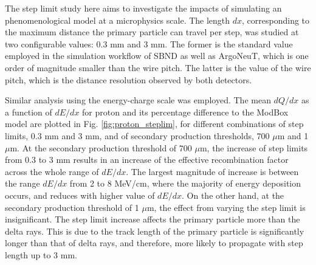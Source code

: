 The step limit study here aims to investigate the impacts of simulating an phenomenological model at a microphysics scale.
The length $dx$, corresponding to the maximum distance the primary particle can travel per step, was studied at two configurable values: 0.3 mm and 3 mm. 
The former is the standard value employed in the simulation workflow of SBND as well as ArgoNeuT, which is one order of magnitude smaller than the wire pitch. 
The latter is the value of the wire pitch, which is the distance resolution observed by both detectors.

Similar analysis using the energy-charge scale was employed.
The mean $dQ/dx$ as a function of $dE/dx$ for proton and its percentage difference to the ModBox model are plotted in Fig. \ref{fig:proton_steplim}, for different combinations of step limits, 0.3 mm and 3 mm, and of secondary production thresholds, 700 $\mu$m and 1 $\mu$m.
At the secondary production threshold of 700 $\mu$m, the increase of step limits from 0.3 to 3 mm results in an increase of the effective recombination factor across the whole range of $dE/dx$.
The largest magnitude of increase is between the range $dE/dx$ from 2 to 8 MeV/cm, where the majority of energy deposition occurs, and reduces with higher value of $dE/dx$.
On the other hand, at the secondary production threshold of 1 $\mu$m, the effect from varying the step limit is insignificant. 
The step limit increase affects the primary particle more than the delta rays.
This is due to the track length of the primary particle is significantly longer than that of delta rays, and therefore, more likely to propagate with step length up to 3 mm.
